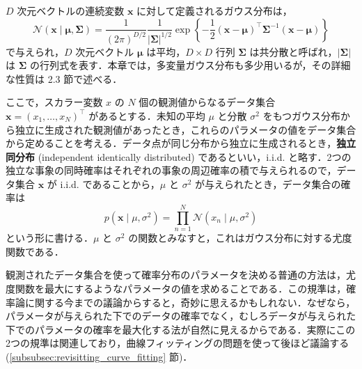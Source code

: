 \documentclass[uplatex,a4paper,oneside,openany,dvipdfmx]{jsarticle}
\numberwithin{equation}{section}
\theoremstyle{mystyle} %
\newcommand{\CN}{\mathcal{N}}
\newcommand{\mb}[1]{\mathbf{#1}}
\newcommand{\tb}[1]{\textbf{#1}}
\newcommand{\bs}[1]{\boldsymbol{#1}}
\begin{document}
$D$ 次元ベクトルの連続変数 $\bs{x}$ に対して定義されるガウス分布は，
\begin{equation} \label{eq:1.52}
    \CN(\bs{x} \mid \bs{\mu}, \bs{\Sigma}) = \frac{1}{(2\pi)^{D/2}} \frac{1}{|\bs{\Sigma}|^{1/2}} \exp{\left\{-\frac{1}{2}(\bs{x}-\bs{\mu})^{\top}\bs{\Sigma}^{-1}(\bs{x}-\bs{\mu})\right\}}
\end{equation}
で与えられ，$D$ 次元ベクトル $\bs{\mu}$ は平均，$D \times D$ 行列 $\bs{\Sigma}$ は共分散と呼ばれ，$|\bs{\Sigma}|$ は $\bs{\Sigma}$ の行列式を表す．本章では，多変量ガウス分布も多少用いるが，その詳細な性質は 2.3 節で述べる．

ここで，スカラー変数 $x$ の $N$ 個の観測値からなるデータ集合 $\mb{x} = (x_{1},\ldots,x_{N})^{\top}$ があるとする．未知の平均 $\mu$ と分散 $\sigma^{2}$ をもつガウス分布から独立に生成された観測値があったとき，これらのパラメータの値をデータ集合から定めることを考える．データ点が同じ分布から独立に生成されるとき，\tb{独立同分布} (independent identically distributed) であるといい，i.i.d. と略す．2つの独立な事象の同時確率はそれぞれの事象の周辺確率の積で与えられるので，データ集合 $\mb{x}$ が i.i.d. であることから，$\mu$ と $\sigma^{2}$ が与えられたとき，データ集合の確率は
\begin{equation} \label{eq:1.53}
    p(\mb{x} \mid \mu,\sigma^{2}) = \prod_{n=1}^{N} \CN(x_{n} \mid \mu,\sigma^{2})
\end{equation}
という形に書ける．$\mu$ と $\sigma^{2}$ の関数とみなすと，これはガウス分布に対する尤度関数である．

観測されたデータ集合を使って確率分布のパラメータを決める普通の方法は，尤度関数を最大にするようなパラメータの値を求めることである．この規準は，確率論に関する今までの議論からすると，奇妙に思えるかもしれない．なぜなら，パラメータが与えられた下でのデータの確率でなく，むしろデータが与えられた下でのパラメータの確率を最大化する法が自然に見えるからである．実際にこの2つの規準は関連しており，曲線フィッティングの問題を使って後ほど議論する (\ref{subsubsec:revisitting_curve_fitting} 節)．
\end{document}
